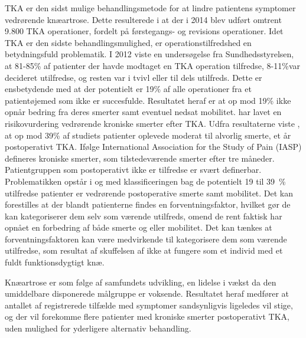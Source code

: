 TKA er den sidst mulige behandlingsmetode for at lindre patientens symptomer vedrørende knæartrose. Dette resulterede i at der i 2014 blev udført omtrent 9.800 TKA operationer, fordelt på førstegangs- og revisions operationer. \citep{aarsrapport2016} Idet TKA er den sidste behandlingsmulighed, er operationstilfredshed en betydningsfuld problematik. I 2012 viste en undersøgelse fra Sundhedsstyrelsen, at 81-85\% af patienter der havde modtaget en TKA operation tilfredse, 8-11\%var decideret utilfredse, og resten var i tvivl eller til dels utilfreds. Dette er ensbetydende med at der potentielt er 19\% af alle operationer fra et patientøjemed som ikke er succesfulde. Resultatet heraf er at op mod 19\% ikke opnår bedring fra deres smerter samt eventuel nedsat mobilitet. \citep{brostrom2012} \cite{Sakellariou2016} har lavet en risikovurdering vedrørende kroniske smerter efter TKA. Udfra resultaterne viste \cite{Sakellariou2016}, at op mod 39\% af studiets patienter oplevede moderat til alvorlig smerte, et år postoperativt TKA. Ifølge International Association for the Study of Pain (IASP) defineres kroniske smerter, som tilstedeværende smerter efter tre måneder. \citep{Sakellariou2016} \\
Patientgruppen som postoperativt ikke er tilfredse er svært definerbar. Problematikken opstår i og med klassificeringen bag de potentielt 19 til 39~\% utilfredse patienter er vedrørende postoperative smerte samt mobilitet. Det kan forestilles at der blandt patienterne findes en forventningsfaktor, hvilket gør de kan kategoriserer dem selv som værende utilfreds, omend de rent faktisk har opnået en forbedring af både smerte og eller mobilitet. Det kan tænkes at forventningsfaktoren kan være medvirkende til kategorisere dem som værende utilfredse, som resultat af skuffelsen af ikke at fungere som et individ med et fuldt funktionsdygtigt knæ.  

Knæartrose er som følge af samfundets udvikling, en lidelse i vækst da den umiddelbare disponerede målgruppe er voksende. Resultatet heraf medfører at antallet af registrerede tilfælde med symptomer sandsynligvis ligeledes vil stige, og der vil forekomme flere patienter med kroniske smerter postoperativt TKA, uden mulighed for yderligere alternativ behandling.

